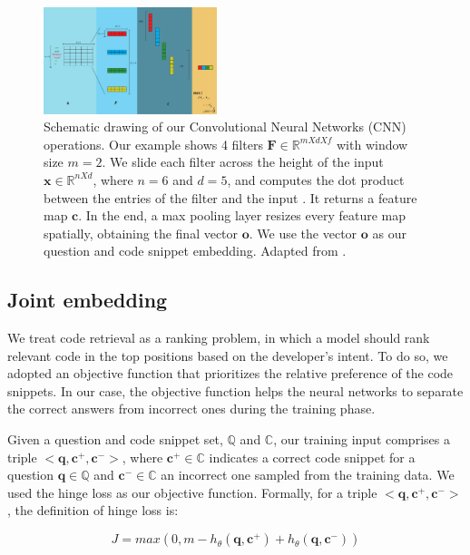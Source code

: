 \documentclass[sigconf]{acmart}
\begin{document}
\begin{figure}[h]
    \centering
    \includegraphics[width=0.45\textwidth]{figuras/cnn-steps-word-embedding-article.pdf}
    \caption{Schematic drawing of our Convolutional Neural Networks (CNN) operations. Our example shows 4 filters $\bm{F} \in \mathbb{R}^{m X d X f}$ with window size $m = 2$. We slide each filter across the height of the input $\bm{x} \in \mathbb{R}^{n X d}$, where $n = 6$ and $d = 5$, and computes the dot product between the entries of the filter and the input \cite{karpathy-course-cnn-2016}. It returns a feature map $\bm{c}$. In the end, a max pooling layer resizes every feature map spatially, obtaining the final vector $\bm{o}$. We use the vector $\bm{o}$ as our question and code snippet embedding. Adapted from \cite{zhang-guide-convolutional-cnn-embedding-ilustration:2015}.}
    \label{fig:cnn-steps-word-embedding}
\end{figure}

\subsection{Joint embedding}
\label{sec:joint-embedding}

We treat code retrieval as a ranking problem, in which a model should rank relevant code in the top positions based on the developer's intent. To do so, we adopted an objective function that prioritizes the relative preference of the code snippets. In our case, the objective function helps the neural networks to separate the correct answers from incorrect ones during the training phase.

Given a question and code snippet set, $\mathbb{Q}$ and $\mathbb{C}$, our training input comprises a triple $<\bm{q}, \bm{c^{+}}, \bm{c^{-}}>$, where $\bm{c^{+}} \in \mathbb{C}$ indicates a correct code snippet for a question $\bm{q} \in \mathbb{Q}$ and $\bm{c^{-}} \in \mathbb{C}$ an incorrect one sampled from the training data. We used the hinge loss as our objective function. Formally, for a triple $<\bm{q}, \bm{c^{+}}, \bm{c^{-}}>$, the definition of hinge loss is:

\begin{equation}
J = max(0, m - h_{\theta}(\bm{q}, \bm{c^{+}}) + h_{\theta}(\bm{q}, \bm{c^{-}}))
\end{equation}
\end{document}

